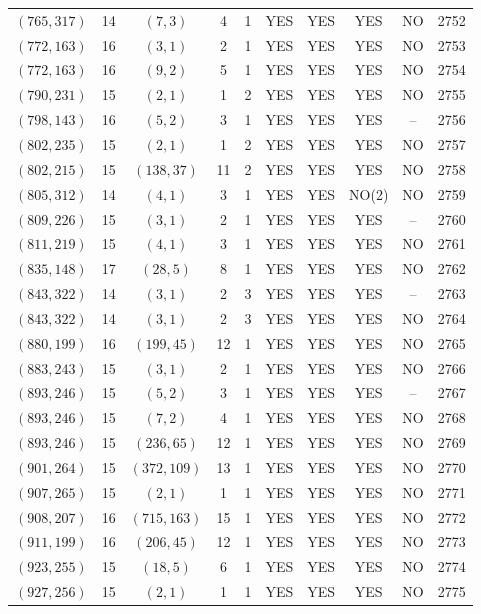 \begin{longtable}{|c|c|c|c|c|c|c|c|c|c|}
$(765, 317)$ & 14 & $(7, 3)$ & 4 & 1 & YES & YES & YES & NO & 2752\\
$(772, 163)$ & 16 & $(3, 1)$ & 2 & 1 & YES & YES & YES & NO & 2753\\
$(772, 163)$ & 16 & $(9, 2)$ & 5 & 1 & YES & YES & YES & NO & 2754\\
$(790, 231)$ & 15 & $(2, 1)$ & 1 & 2 & YES & YES & YES & NO & 2755\\
$(798, 143)$ & 16 & $(5, 2)$ & 3 & 1 & YES & YES & YES & -- & 2756\\
$(802, 235)$ & 15 & $(2, 1)$ & 1 & 2 & YES & YES & YES & NO & 2757\\
$(802, 215)$ & 15 & $(138, 37)$ & 11 & 2 & YES & YES & YES & NO & 2758\\
$(805, 312)$ & 14 & $(4, 1)$ & 3 & 1 & YES & YES & NO(2) & NO & 2759\\
$(809, 226)$ & 15 & $(3, 1)$ & 2 & 1 & YES & YES & YES & -- & 2760\\
$(811, 219)$ & 15 & $(4, 1)$ & 3 & 1 & YES & YES & YES & NO & 2761\\
$(835, 148)$ & 17 & $(28, 5)$ & 8 & 1 & YES & YES & YES & NO & 2762\\
$(843, 322)$ & 14 & $(3, 1)$ & 2 & 3 & YES & YES & YES & -- & 2763\\
$(843, 322)$ & 14 & $(3, 1)$ & 2 & 3 & YES & YES & YES & NO & 2764\\
$(880, 199)$ & 16 & $(199, 45)$ & 12 & 1 & YES & YES & YES & NO & 2765\\
$(883, 243)$ & 15 & $(3, 1)$ & 2 & 1 & YES & YES & YES & NO & 2766\\
$(893, 246)$ & 15 & $(5, 2)$ & 3 & 1 & YES & YES & YES & -- & 2767\\
$(893, 246)$ & 15 & $(7, 2)$ & 4 & 1 & YES & YES & YES & NO & 2768\\
$(893, 246)$ & 15 & $(236, 65)$ & 12 & 1 & YES & YES & YES & NO & 2769\\
$(901, 264)$ & 15 & $(372, 109)$ & 13 & 1 & YES & YES & YES & NO & 2770\\
$(907, 265)$ & 15 & $(2, 1)$ & 1 & 1 & YES & YES & YES & NO & 2771\\
$(908, 207)$ & 16 & $(715, 163)$ & 15 & 1 & YES & YES & YES & NO & 2772\\
$(911, 199)$ & 16 & $(206, 45)$ & 12 & 1 & YES & YES & YES & NO & 2773\\
$(923, 255)$ & 15 & $(18, 5)$ & 6 & 1 & YES & YES & YES & NO & 2774\\
$(927, 256)$ & 15 & $(2, 1)$ & 1 & 1 & YES & YES & YES & NO & 2775\\

\end{longtable}
